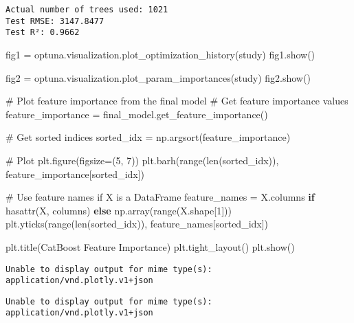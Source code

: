 \documentclass[
  letterpaper,
  DIV=11,
  numbers=noendperiod]{scrreprt}
\newenvironment{Shaded}{\begin{snugshade}}{\end{snugshade}}
\newcommand{\BuiltInTok}[1]{\textcolor[rgb]{0.00,0.23,0.31}{#1}}
\newcommand{\CommentTok}[1]{\textcolor[rgb]{0.37,0.37,0.37}{#1}}
\newcommand{\ControlFlowTok}[1]{\textcolor[rgb]{0.00,0.23,0.31}{\textbf{#1}}}
\newcommand{\DecValTok}[1]{\textcolor[rgb]{0.68,0.00,0.00}{#1}}
\newcommand{\NormalTok}[1]{\textcolor[rgb]{0.00,0.23,0.31}{#1}}
\newcommand{\OperatorTok}[1]{\textcolor[rgb]{0.37,0.37,0.37}{#1}}
\newcommand{\StringTok}[1]{\textcolor[rgb]{0.13,0.47,0.30}{#1}}
\begin{document}
\begin{verbatim}
Actual number of trees used: 1021
Test RMSE: 3147.8477
Test R²: 0.9662
\end{verbatim}

\begin{Shaded}
\begin{Highlighting}[]
\NormalTok{fig1 }\OperatorTok{=}\NormalTok{ optuna.visualization.plot\_optimization\_history(study)}
\NormalTok{fig1.show()}
    
\NormalTok{fig2 }\OperatorTok{=}\NormalTok{ optuna.visualization.plot\_param\_importances(study)}
\NormalTok{fig2.show()}
    
\CommentTok{\# Plot feature importance from the final model}
\CommentTok{\# Get feature importance values}
\NormalTok{feature\_importance }\OperatorTok{=}\NormalTok{ final\_model.get\_feature\_importance()}

\CommentTok{\# Get sorted indices}
\NormalTok{sorted\_idx }\OperatorTok{=}\NormalTok{ np.argsort(feature\_importance)}

\CommentTok{\# Plot}
\NormalTok{plt.figure(figsize}\OperatorTok{=}\NormalTok{(}\DecValTok{5}\NormalTok{, }\DecValTok{7}\NormalTok{))}
\NormalTok{plt.barh(}\BuiltInTok{range}\NormalTok{(}\BuiltInTok{len}\NormalTok{(sorted\_idx)), feature\_importance[sorted\_idx])}

\CommentTok{\# Use feature names if X is a DataFrame}
\NormalTok{feature\_names }\OperatorTok{=}\NormalTok{ X.columns }\ControlFlowTok{if} \BuiltInTok{hasattr}\NormalTok{(X, }\StringTok{\textquotesingle{}columns\textquotesingle{}}\NormalTok{) }\ControlFlowTok{else}\NormalTok{ np.array(}\BuiltInTok{range}\NormalTok{(X.shape[}\DecValTok{1}\NormalTok{]))}
\NormalTok{plt.yticks(}\BuiltInTok{range}\NormalTok{(}\BuiltInTok{len}\NormalTok{(sorted\_idx)), feature\_names[sorted\_idx])}

\NormalTok{plt.title(}\StringTok{\textquotesingle{}CatBoost Feature Importance\textquotesingle{}}\NormalTok{)}
\NormalTok{plt.tight\_layout()}
\NormalTok{plt.show()}
\end{Highlighting}
\end{Shaded}

\begin{verbatim}
Unable to display output for mime type(s): application/vnd.plotly.v1+json
\end{verbatim}

\begin{verbatim}
Unable to display output for mime type(s): application/vnd.plotly.v1+json
\end{verbatim}
\end{document}
